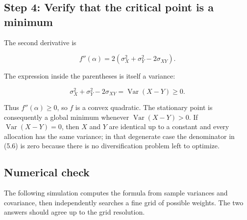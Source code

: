 \documentclass[
  11pt,
]{article}
\begin{document}
\subsection{Step 4: Verify that the critical point is a
minimum}\label{step-4-verify-that-the-critical-point-is-a-minimum}

The second derivative is

\[
f''(\alpha) =
2\left(\sigma_X^2 + \sigma_Y^2 - 2\sigma_{XY}\right).
\]

The expression inside the parentheses is itself a variance:

\[
\sigma_X^2 + \sigma_Y^2 - 2\sigma_{XY}
= \operatorname{Var}(X-Y) \geq 0.
\]

Thus \(f''(\alpha)\geq 0\), so \(f\) is a convex quadratic. The
stationary point is consequently a global minimum whenever
\(\operatorname{Var}(X-Y)>0\). If \(\operatorname{Var}(X-Y)=0\), then
\(X\) and \(Y\) are identical up to a constant and every allocation has
the same variance; in that degenerate case the denominator in (5.6) is
zero because there is no diversification problem left to optimize.

\subsection{Numerical check}\label{numerical-check}

The following simulation computes the formula from sample variances and
covariance, then independently searches a fine grid of possible weights.
The two answers should agree up to the grid resolution.
\end{document}
